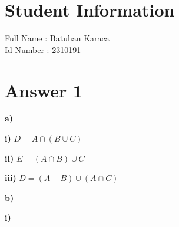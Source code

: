 \documentclass[11pt]{article}
\begin{document}
\section*{Student Information } 
Full Name : Batuhan Karaca \\
Id Number : 2310191 \\

\section*{Answer 1}
\begin{flushleft}
    \textbf{a)} 
\end{flushleft}
\begin{flushleft}
    \textbf{i)} $D=A \cap (B \cup C)$
\end{flushleft}
\begin{flushleft}
    \textbf{ii)} $E=(A \cap B) \cup C$
\end{flushleft}
\begin{flushleft}
    \textbf{iii)} $D=(A - B) \cup (A \cap C)$
\end{flushleft}
\begin{flushleft}
    \textbf{b)} 
\end{flushleft}
\begin{flushleft}
    \textbf{i)} 
\end{flushleft}
\end{document}
